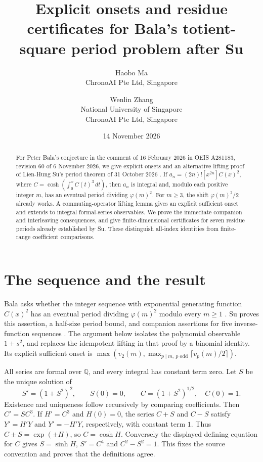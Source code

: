\documentclass[11pt]{article}
\title{Explicit onsets and residue certificates for Bala's\unskip\break
totient-square period problem after Su}
\author{Haobo Ma\\
\small ChronoAI Pte Ltd, Singapore
\and Wenlin Zhang\\
\small National University of Singapore\\
\small ChronoAI Pte Ltd, Singapore}
\date{14 November 2026}
\begin{document}
\maketitle
\begin{abstract}
For Peter Bala's conjecture in the comment of 16 February 2026 in
OEIS A281183, revision 60 of 6 November 2026, we give explicit onsets
and an alternative lifting proof of Lien-Hung Su's period theorem
of 31 October 2026 \cite[Theorem 3.2 and Corollary 3.3]{su}.
If $a_n=(2n)![x^{2n}]C(x)^2$, where
$C=\cosh(\int_0^x C(t)^3\,dt)$, then $a_n$ is integral and,
modulo each positive integer $m$, has an eventual period dividing
$\varphi(m)^2$. For $m\ge3$, the shift $\varphi(m)^2/2$ already
works. A commuting-operator lifting lemma gives an explicit sufficient
onset and extends to integral formal-series observables. We prove
the immediate companion and interleaving consequences, and give
finite-dimensional certificates for seven residue periods already
established by Su. These distinguish all-index identities from
finite-range coefficient comparisons.
\end{abstract}

\section{The sequence and the result}
Bala asks whether the integer sequence with exponential generating function
$C(x)^2$ has an eventual period dividing $\varphi(m)^2$ modulo every
$m\ge1$ \cite{oeis183}. Su proves this assertion, a half-size period
bound, and companion assertions for five inverse-function sequences
\cite[Section 3]{su}. The argument below isolates the polynomial
observable $1+s^2$, and replaces the idempotent lifting in that proof
by a binomial identity. Its explicit sufficient onset is
$\max(v_2(m),\max_{p\mid m,\ p\text{ odd}}\lceil v_p(m)/2\rceil)$.

All series are formal over $\mathbb Q$, and every integral has constant
term zero. Let $S$ be the unique solution of
\[
 S'=(1+S^2)^2,\qquad S(0)=0,
 \qquad C=(1+S^2)^{1/2},\quad C(0)=1.
\]
Existence and uniqueness follow recursively by comparing coefficients.
Then $C'=SC^3$. If $H'=C^3$ and $H(0)=0$, the series $C+S$ and
$C-S$ satisfy $Y'=H'Y$ and $Y'=-H'Y$, respectively, with constant
term $1$. Thus $C\pm S=\exp(\pm H)$, so $C=\cosh H$.
Conversely the displayed defining equation for $C$ gives
$S=\sinh H$, $S'=C^4$ and $C^2-S^2=1$. This fixes the source
convention and proves that the definitions agree.
\end{document}
